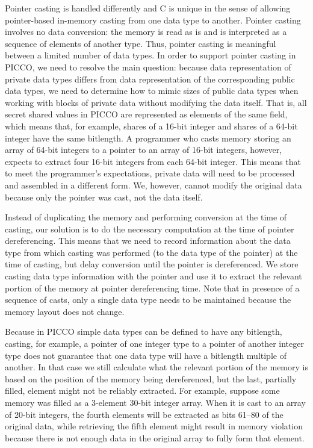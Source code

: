 \documentclass[11pt]{article}
\begin{document}
Pointer casting is handled differently and C is unique in the sense of
allowing pointer-based in-memory casting from one data type to another.
Pointer casting involves no data conversion: the memory is read as is and is
interpreted as a sequence of elements of another type. Thus, pointer casting
is meaningful between a limited number of data types. In order to support
pointer casting in PICCO, we need to resolve the main question: because data
representation of private data types differs from data representation of the
corresponding public data types, we need to determine how to mimic sizes of
public data types when working with blocks of private data without modifying
the data itself. That is, all secret shared values in PICCO are represented
as elements of the same field, which means that, for example, shares of a
16-bit integer and shares of a 64-bit integer have the same bitlength. A
programmer who casts memory storing an array of 64-bit integers to a pointer
to an array of 16-bit integers, however, expects to extract four 16-bit
integers from each 64-bit integer. This means that to meet the programmer's
expectations, private data will need to be processed and assembled in a
different form. We, however, cannot modify the original data because only
the pointer was cast, not the data itself.

Instead of duplicating the memory and performing conversion at the
time of casting, our solution is to do the necessary computation at
the time of pointer dereferencing. This means that we need to record
information about the data type from which casting was performed (to
the data type of the pointer) at the time of casting, but delay
conversion until the pointer is dereferenced. We store casting data
type information with the pointer and use it to extract the relevant
portion of the memory at pointer dereferencing time. Note that in
presence of a sequence of casts, only a single data type needs to be
maintained because the memory layout does not change. 

Because in PICCO simple data types can be defined to
have any bitlength, casting, for example, a pointer of one integer type to a
pointer of another integer type does not guarantee that one data type will
have a bitlength multiple of another. In that case we still calculate what
the relevant portion of the memory is based on the position of the memory
being dereferenced, but the last, partially filled, element might not be
reliably extracted. For example, suppose some memory was filled as a
3-element 30-bit integer array. When it is cast to an array of 20-bit
integers, the fourth elements will be extracted as bits 61--80 of the
original data, while retrieving the fifth element might result in memory
violation because there is not enough data in the original array to fully
form that element.
\end{document}
